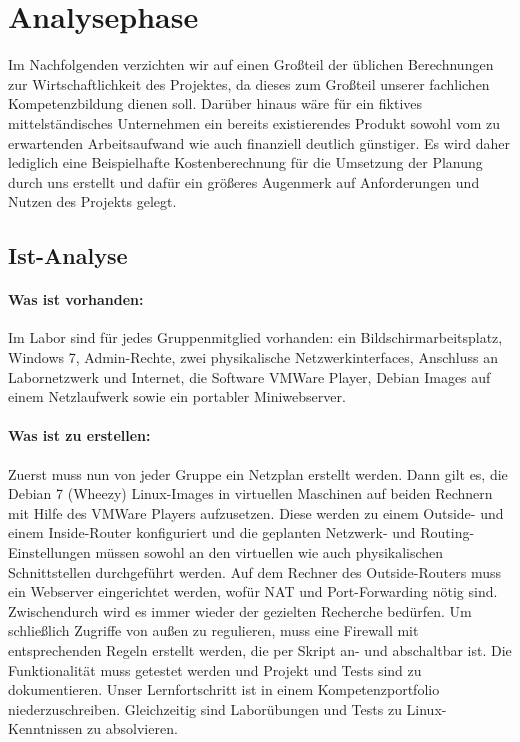\section{Analysephase} 
\label{sec:Analysephase}
Im Nachfolgenden verzichten wir auf einen Großteil der üblichen Berechnungen zur Wirtschaftlichkeit des Projektes, da dieses zum Großteil unserer fachlichen Kompetenzbildung dienen soll. Darüber hinaus wäre für ein fiktives mittelständisches Unternehmen ein bereits existierendes Produkt sowohl vom zu erwartenden Arbeitsaufwand wie auch finanziell deutlich günstiger. Es wird daher lediglich eine Beispielhafte Kostenberechnung für die Umsetzung der Planung durch uns erstellt und dafür ein größeres Augenmerk auf Anforderungen und Nutzen des Projekts gelegt. 

\subsection{Ist-Analyse} 
\label{sec:IstAnalyse}
\paragraph*{Was ist vorhanden: } Im Labor sind für jedes Gruppenmitglied vorhanden: ein Bildschirmarbeitsplatz, Windows 7, Admin-Rechte, zwei physikalische Netzwerkinterfaces, Anschluss an Labornetzwerk und Internet, die Software VMWare Player, Debian Images auf einem Netzlaufwerk sowie ein portabler Miniwebserver.
\paragraph*{Was ist zu erstellen: } Zuerst muss nun von jeder Gruppe ein Netzplan erstellt werden. Dann gilt es, die Debian 7 (Wheezy) Linux-Images in virtuellen Maschinen auf beiden Rechnern mit Hilfe des VMWare Players aufzusetzen. Diese werden zu einem Outside- und einem Inside-Router konfiguriert und die geplanten Netzwerk- und Routing-Einstellungen müssen sowohl an den virtuellen wie auch physikalischen Schnittstellen durchgeführt werden. Auf dem Rechner des Outside-Routers muss ein Webserver eingerichtet werden, wofür \ac{NAT} und Port-Forwarding nötig sind. Zwischendurch wird es immer wieder der gezielten Recherche bedürfen. Um schließlich Zugriffe von außen zu regulieren, muss eine Firewall mit entsprechenden Regeln erstellt werden, die per Skript an- und abschaltbar ist. Die Funktionalität muss getestet werden und Projekt und Tests sind zu dokumentieren. Unser Lernfortschritt ist in einem Kompetenzportfolio niederzuschreiben. Gleichzeitig sind Laborübungen und Tests zu Linux-Kenntnissen zu absolvieren.

